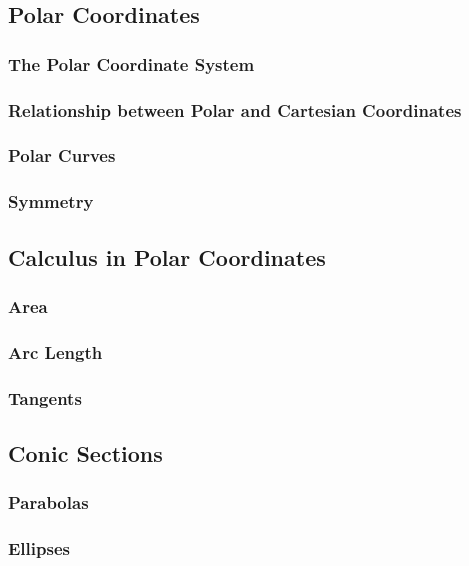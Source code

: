 \subsection{Polar Coordinates}

\subsubsection*{The Polar Coordinate System}

\subsubsection*{Relationship between Polar and Cartesian Coordinates}

\subsubsection*{Polar Curves}

\subsubsection*{Symmetry}

\subsection{Calculus in Polar Coordinates}

\subsubsection*{Area}

\subsubsection*{Arc Length}

\subsubsection*{Tangents}

\subsection{Conic Sections}

\subsubsection*{Parabolas}

\subsubsection*{Ellipses}

